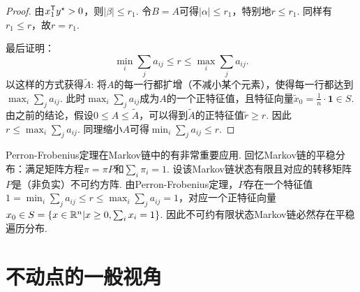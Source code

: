 \begin{proof}
由$x_1^{\mathsf{T}} y^\star>0$，则$|\beta|\le r_1$. 令$B=A$可得$|\alpha|\le r_1$，特别地$r\le r_1$. 同样有$r_1\le r$，故$r=r_1$. 

最后证明：
\[\min_i\sum_j a_{ij}\le r\le \max_i\sum_j a_{ij}.\]
以这样的方式获得$\tilde A$: 将$A$的每一行都扩增（不减小某个元素），使得每一行都达到$\max_i\sum_j a_{ij}$. 此时$\max_i\sum_j a_{ij}$成为$A$的一个正特征值，且特征向量$\tilde{x}_0=\frac 1n\cdot\mathbf{1}\in S$. 由之前的结论，假设$0\le A\le \tilde A$，可以得到$\tilde A$的正特征值$\tilde r\ge r$. 因此$r \le \max_i\sum_j a_{ij}$. 同理缩小$A$可得$\min_i\sum_j a_{ij}\le r$.
\end{proof}

Perron-Frobenius定理在Markov链中的有非常重要应用. 回忆Markov链的平稳分布：满足矩阵方程$\pi = \pi P$和$\sum_i\pi_i=1$.  设该Markov链状态有限且对应的转移矩阵$P$是（非负实）不可约方阵. 由Perron-Frobenius定理，$P$存在一个特征值$1=\min_i\sum_ja_{ij}\le r\le\max_i\sum_j a_{ij}=1$，对应一个正特征向量$x_0\in S=\{x\in\mathbb{R}^n|x\ge 0,\sum_ix_i=1\}$. 因此不可约有限状态Markov链必然存在平稳遍历分布.


\section{不动点的一般视角}\label{sec:fixed-point-general-view}
    